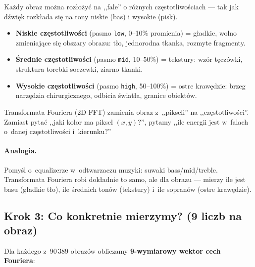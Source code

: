 Każdy obraz można rozłożyć na ,,fale'' o różnych częstotliwościach --- tak jak
dźwięk rozkłada się na tony niskie (bas) i wysokie (pisk).

\begin{itemize}
    \item \textbf{Niskie częstotliwości} (pasmo \texttt{low}, 0--10\% promienia)
          = gładkie, wolno zmieniające się obszary obrazu: tło, jednorodna
          tkanka, rozmyte fragmenty.

    \item \textbf{Średnie częstotliwości} (pasmo \texttt{mid}, 10--50\%)
          = tekstury: wzór tęczówki, struktura torebki soczewki, ziarno tkanki.

    \item \textbf{Wysokie częstotliwości} (pasmo \texttt{high}, 50--100\%)
          = ostre krawędzie: brzeg narzędzia chirurgicznego, odbicia światła,
          granice obiektów.
\end{itemize}

Transformata Fouriera (2D FFT) zamienia obraz z~,,pikseli'' na
,,częstotliwości''.  Zamiast pytać ,,jaki kolor ma piksel $(x,y)$?'', pytamy
,,ile energii jest w~falach o~danej częstotliwości i~kierunku?''

\paragraph{Analogia.}
Pomyśl o~equalizerze w~odtwarzaczu muzyki: suwaki bass/mid/treble.
Transformata Fouriera robi dokładnie to samo, ale dla obrazu --- mierzy ile
jest basu (gładkie tło), ile średnich tonów (tekstury) i~ile sopranów (ostre
krawędzie).


\subsection{Krok 3: Co konkretnie mierzymy? (9 liczb na obraz)}
\label{sec:krok3}

Dla każdego z~90\,389 obrazów obliczamy \textbf{9-wymiarowy wektor cech
Fouriera}:

